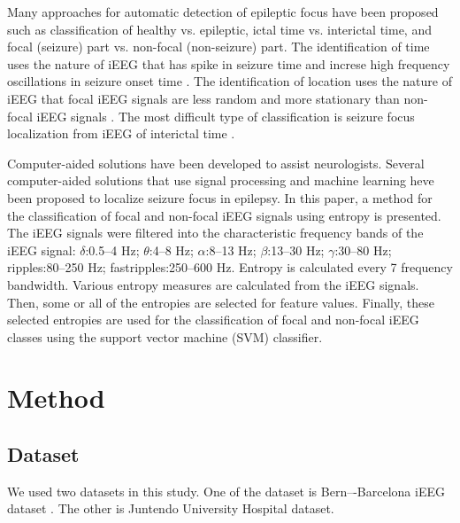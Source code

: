 \documentclass[letterpaper, 10 pt, conference]{ieeeconf}  %
\begin{document}
Many approaches for automatic detection of epileptic focus have been proposed such as classification of healthy vs. epileptic, ictal time vs. interictal time, and focal (seizure) part vs. non-focal (non-seizure) part.
The identification of time uses the nature of iEEG that has spike in seizure time and increse high frequency oscillations in seizure onset time \cite{gutierrez2001, worrell2004}.
The identification of location uses the nature of iEEG that focal iEEG signals are less random and more stationary than non-focal iEEG signals \cite{andrzejak2012}.
The most difficult type of classification is seizure focus localization from iEEG of interictal time \cite{faust2015}.

Computer-aided solutions have been developed to assist neurologists.
Several computer-aided solutions that use signal processing and machine learning heve been proposed to localize seizure focus in epilepsy.
In this paper, a method for the classification of focal and non-focal iEEG signals using entropy is presented.
The iEEG signals were filtered into the characteristic frequency bands of the iEEG signal:
$\delta$:0.5--4 Hz; 
$\theta$:4--8 Hz; 
$\alpha$:8--13 Hz; 
$\beta$:13--30 Hz; 
$\gamma$:30--80 Hz; 
ripples:80--250 Hz; 
fastripples:250--600 Hz.
Entropy is calculated every 7 frequency bandwidth.
Various entropy measures are calculated from the iEEG signals.
Then, some or all of the entropies are selected for feature values.
Finally, these selected entropies are used for the classification of focal and non-focal iEEG classes using the support vector machine (SVM) classifier.




\section{Method}
\subsection{Dataset}
We used two datasets in this study.
One of the dataset is Bern–-Barcelona iEEG dataset \cite{andrzejak2012}.
The other is Juntendo University Hospital dataset.
\end{document}
